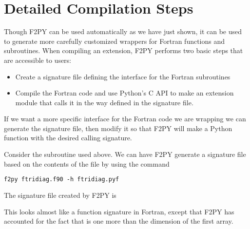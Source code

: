 \section*{Detailed Compilation Steps}
Though F2PY can be used automatically as we have just shown, it can be used to generate more carefully customized wrappers for Fortran functions and subroutines.
When compiling an extension, F2PY performs two basic steps that are accessible to users:
\begin{itemize}
\item Create a  signature file defining the interface for the Fortran subroutines
\item Compile the Fortran code and use Python's C API to make an extension module that calls it in the way defined in the signature file.
\end{itemize}
If we want a more specific interface for the Fortran code we are wrapping we can generate the signature file, then modify it so that F2PY will make a Python function with the desired calling signature.

Consider the  subroutine used above.
We can have F2PY generate a signature file based on the contents of the file  by using the command
\begin{lstlisting}[style=ShellInput]
f2py ftridiag.f90 -h ftridiag.pyf
\end{lstlisting}
The signature file created by F2PY is

This looks almost like a function signature in Fortran, except that F2PY has accounted for the fact that  is one more than the dimension of the first array.




